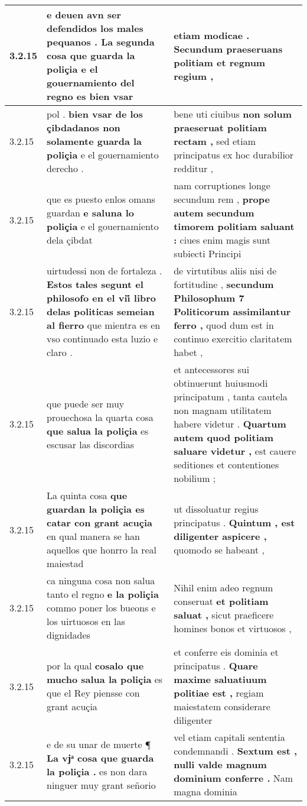 \begin{tabular}{|p{1cm}|p{6.5cm}|p{6.5cm}|}
3.2.15 & e deuen avn ser defendidos los males pequanos . \textbf{ La segunda cosa que guarda la poliçia } e el gouernamiento del regno es bien vsar & etiam modicae . \textbf{ Secundum praeseruans politiam } et regnum regium , \\\hline
3.2.15 & pol . \textbf{ bien vsar de los çibdadanos non solamente guarda la poliçia } e el gouernamiento derecho . & bene uti ciuibus \textbf{ non solum praeseruat politiam rectam , } sed etiam principatus ex hoc durabilior redditur , \\\hline
3.2.15 & que es puesto enlos omans guardan \textbf{ e saluna lo poliçia } e el gouernamiento dela çibdat & nam corruptiones longe secundum rem , \textbf{ prope autem secundum timorem politiam saluant : } ciues enim magis sunt subiecti Principi \\\hline
3.2.15 & uirtudessi non de fortaleza . \textbf{ Estos tales segunt el philosofo en el vii̊ libro delas politicas semeian al fierro } que mientra es en vso continuado esta luzio e claro . & de virtutibus aliis nisi de fortitudine , \textbf{ secundum Philosophum 7 Politicorum assimilantur ferro , } quod dum est in continuo exercitio claritatem habet , \\\hline
3.2.15 & que puede ser muy prouechosa la quarta cosa \textbf{ que salua la poliçia } es escusar las discordias & et antecessores sui obtinuerunt huiusmodi principatum , tanta cautela non magnam utilitatem habere videtur . \textbf{ Quartum autem quod politiam saluare videtur , } est cauere seditiones et contentiones nobilium ; \\\hline
3.2.15 & La quinta cosa \textbf{ que guardan la poliçia es catar con grant acuçia } en qual manera se han aquellos que honrro la real maiestad & ut dissoluatur regius principatus . \textbf{ Quintum , est diligenter aspicere , } quomodo se habeant , \\\hline
3.2.15 & ca ninguna cosa non salua tanto el regno \textbf{ e la poliçia } commo poner los bueons e los uirtuosos en las dignidades & Nihil enim adeo regnum conseruat \textbf{ et politiam saluat , } sicut praeficere homines bonos et virtuosos , \\\hline
3.2.15 & por la qual \textbf{ cosalo que mucho salua la poliçia } es que el Rey piensse con grant acuçia & et conferre eis dominia et principatus . \textbf{ Quare maxime saluatiuum politiae est , } regiam maiestatem considerare diligenter \\\hline
3.2.15 & e de su unar de muerte ¶ \textbf{ La vjͣ cosa que guarda la poliçia . } es non dara ninguer muy grant señorio & vel etiam capitali sententia condemnandi . \textbf{ Sextum est , nulli valde magnum dominium conferre . } Nam magna dominia \\\hline

\end{tabular}
